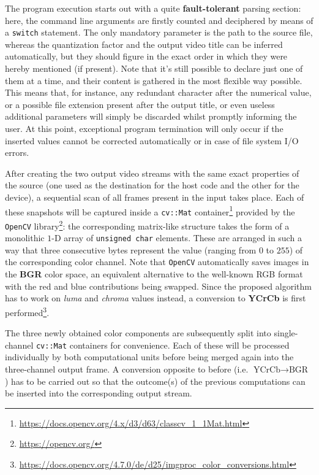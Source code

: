 \documentclass{article}
\begin{document}
The program execution starts out with a quite \textbf{fault-tolerant} parsing section: here, the command line arguments are firstly counted and deciphered by means of a \texttt{switch} statement. The only mandatory parameter is the path to the source file, whereas the quantization factor and the output video title can be inferred automatically, but they should figure in the exact order in which they were hereby mentioned (if present). Note that it's still possible to declare just one of them at a time, and their content is gathered in the most flexible way possible. This means that, for instance, any redundant character after the numerical value, or a possible file extension present after the output title, or even useless additional parameters will simply be discarded whilst promptly informing the user. At this point, exceptional program termination will only occur if the inserted values cannot be corrected automatically or in case of file system I/O errors.

After creating the two output video streams with the same exact properties of the source (one used as the destination for the host code and the other for the device), a sequential scan of all frames present in the input takes place. Each of these snapshots will be captured inside a \texttt{cv::Mat} container\footnote{\url{https://docs.opencv.org/4.x/d3/d63/classcv_1_1Mat.html}} provided by the \texttt{OpenCV} library\footnote{\url{https://opencv.org/}}: the corresponding matrix-like structure takes the form of a monolithic $1$-D array of \texttt{unsigned char} elements. These are arranged in such a way that three consecutive bytes represent the value (ranging from $0$ to $255$) of the corresponding color channel. Note that \texttt{OpenCV} automatically saves images in the \textbf{BGR} color space, an equivalent alternative to the well-known RGB format with the red and blue contributions being swapped. Since the proposed algorithm has to work on \textit{luma} and \textit{chroma} values instead, a conversion to \textbf{YCrCb} is first performed\footnote{\url{https://docs.opencv.org/4.7.0/de/d25/imgproc_color_conversions.html}}.

The three newly obtained color components are subsequently split into single-channel \texttt{cv::Mat} containers for convenience. Each of these will be processed individually by both computational units before being merged again into the three-channel output frame. A conversion opposite to before (i.e. \textbf{$\textrm{YCrCb}\rightarrow \textrm{BGR}$}) has to be carried out so that the outcome(s) of the previous computations can be inserted into the corresponding output stream. 
\end{document}
